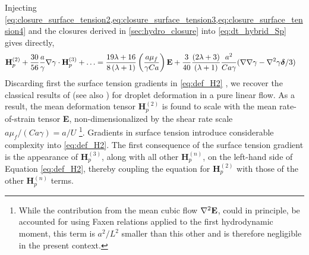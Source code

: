 Injecting \ref{eq:closure_surface_tension2,eq:closure_surface_tension3,eq:closure_surface_tension4} and the closures derived in \ref{sec:hydro_closure}  into \ref{eq:dt_hybrid_Sp} gives directly,
\begin{align}    
    \textbf{H}_p^{(2)}
    +
    \frac{30}{56}\frac{a}{\gamma}\grad\gamma\cdot \textbf{H}^{(3)}_p
    + \ldots
    &=
    \frac{19 \lambda + 16}{8 \left(\lambda + 1\right)}
    \left(\frac{a \mu_f}{\gamma Ca}\right)
    \textbf{E}
    + 
    \frac{3}{40}\frac{(2\lambda +3)}{(\lambda+1)} 
    \frac{a^2}{Ca\gamma} 
    (\grad\grad\gamma-\grad^2\gamma\bm\delta/3)
    \label{eq:def_H2}
\end{align}
Discarding first the surface tension gradients in \ref{eq:def_H2} , we recover the classical results of \citet{taylor1932viscosity} (see also \citet{rallison1984deformation}) for droplet deformation in a pure linear flow.
As a result, the mean deformation tensor  $\textbf{H}_p^{(2)}$  is found to scale with the mean rate-of-strain tensor  \textbf{E}, non-dimensionalized by the shear rate scale $a \mu_f /(Ca \gamma)= a/U$ \footnote{While the contribution from the mean cubic flow $\mathbf{\nabla}^2\textbf{E}$, could in principle, be accounted for using Faxen relations applied to the first hydrodynamic moment, this term is $a^2/L^2$ smaller than this other and is therefore negligible in the present context.}.
Gradients in surface tension introduce considerable complexity into \ref{eq:def_H2}.
The first consequence of the surface tension gradient is the appearance of $\textbf{H}_p^{(3)}$, along with all other $\textbf{H}_p^{(n)}$, on the left-hand side of Equation \ref{eq:def_H2}, thereby coupling the equation for $\textbf{H}_p^{(2)}$ with those of the other $\textbf{H}_p^{(n)}$ terms.

